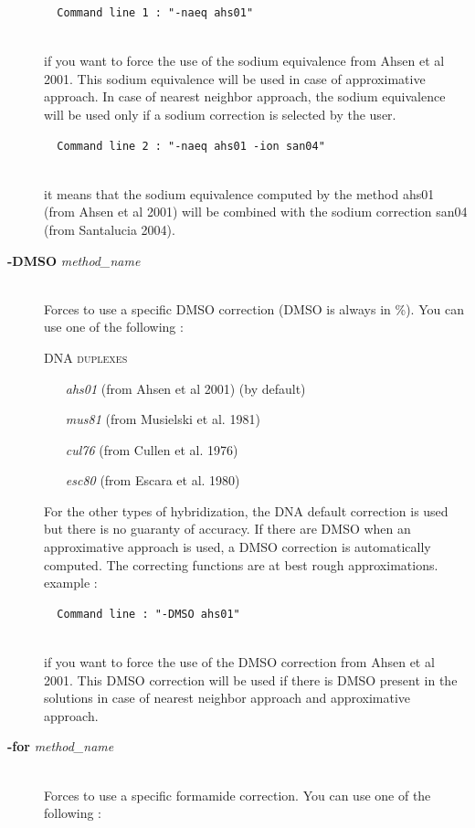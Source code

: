 \documentclass{article}
\begin{document}
\begin{description}
  \begin{verbatim}
  Command line 1 : "-naeq ahs01" 
  
    \end{verbatim}
  if you want to force the use of the sodium equivalence from Ahsen et al 2001. This sodium equivalence 
  will be used in case of approximative approach. In case of nearest neighbor approach, the sodium equivalence 
  will be used only if a sodium correction is selected by the user.
    
    \begin{verbatim}
  Command line 2 : "-naeq ahs01 -ion san04" 
  
    \end{verbatim}
  it means that the sodium equivalence computed by the method ahs01 (from Ahsen et al 2001) will be combined with the 
  sodium correction san04 (from Santalucia 2004).
  
  
\item [\textbf{-DMSO} \textit{method\_name}]\mbox{}\\ 
  Forces to use a specific DMSO correction (DMSO is always in \%).
  You can use one of the following :
  
  \textsc{DNA duplexes}
    \begin{itemize}
    \item [\textit{ahs01}] (from Ahsen et al 2001)  (by default)
    \item [\textit{mus81}] (from Musielski et al. 1981)
    \item [\textit{cul76}] (from Cullen et al. 1976)	
    \item [\textit{esc80}] (from Escara et al. 1980)		 	 
    \end{itemize}
  For the other types of hybridization, the DNA default correction is used but there is no guaranty of accuracy.
  If there are DMSO when an approximative approach is used, a DMSO correction is automatically computed.
  The correcting functions are  at  best rough  approximations.
  example :
  
  \begin{verbatim}
  Command line : "-DMSO ahs01"  
  
  \end{verbatim} 
  if you want to force the use of the DMSO correction from Ahsen et al 2001. This DMSO correction will be used if there is 
  DMSO present in the solutions in case of nearest neighbor approach and approximative approach.
\item [\textbf{-for} \textit{method\_name}]\mbox{}\\ 
  Forces to use a specific formamide correction.
  You can use one of the following :
  

\end{description}
\end{document}
